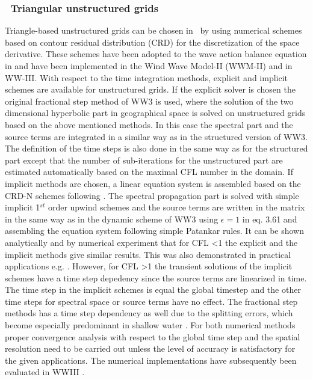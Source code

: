 \vssub
\subsubsection{~Triangular unstructured grids} \label{sub:num_space_tri}

\noindent
Triangle-based unstructured grids can be chosen in \ws\ by using
numerical schemes based on contour residual distribution (CRD)
\citep{art:ricchiuto2005} for the discretization of the space
derivative. These schemes have been adopted to the wave action
balance equation in \citep{rep:Roland2008} and have been
implemented in the Wind Wave Model-II (WWM-II) and in WW-III.
With respect to the time integration methods, explicit
and implicit schemes are available for unstructured grids.
If the explicit solver is chosen the original fractional step
method of WW3 is used, where the solution of the two dimensional
hyperbolic part in geographical space is solved on unstructured
grids based on the above mentioned methods. In this case the
spectral part and the source terms are integrated in a similar
way as in the structured version of WW3. The definition of the time
steps is also done in the same way as for the structured part except
that the number of sub-iterations for the unstructured part are estimated
automatically based on the maximal CFL number in the domain. If implicit methods
are chosen, a linear equation system is assembled based
on the CRD-N schemes following \citep{rep:Roland2008}.
The spectral propagation part is solved with simple implicit
1$^{st}$ order upwind schemes and the source terms are written  in
the matrix in the same way as in the dynamic
scheme of WW3 using $\epsilon = 1$ in eq. 3.61 and assembling the
equation system following simple Patankar rules.
It can be shown analytically and by numerical experiment that
for CFL \textless 1 the explicit and the implicit methods give similar results.
This was also demonstrated in practical applications
e.g. \citep{rep:Abdolalli2018, Smith2018, rep:Abdolalli2019}. However, for CFL \textgreater 1
the transient solutions of the implicit schemes
have a time step depedency since the source terms are linearized
in time. The time step in the implicit schemes is equal the global timestep
and the other time steps for spectral space or source terms have no effect.
The fractional step methods has a time step
dependency as well due to the splitting errors, which become
especially predominant in shallow water \citep{rep:Roland2008}.
For both numerical methods proper convergence analysis with respect
to the global time step and the spatial resolution
need to be carried out unless the level of accuracy is
satisfactory for the given applications. The numerical implementations
have subsequently been evaluated in WWIII \citep[e.g.][]{art:Aea09,art:babanin2011,art:bertin2014,
art:bertin2015,art:dodet2013,art:ferrarin2008,art:ferrarin2013,art:janekovic2015,art:kerr2013,art:liau2011,art:Mea10,art:perrie2018,
art:perrie2013two,pro:rol2006a,pro:rol2006b,art:rol2009,art:rol2012,art:rol2014,art:sikiric2012,art:sikiric2013,art:sikiric2018,
pro:zanke2006}.


